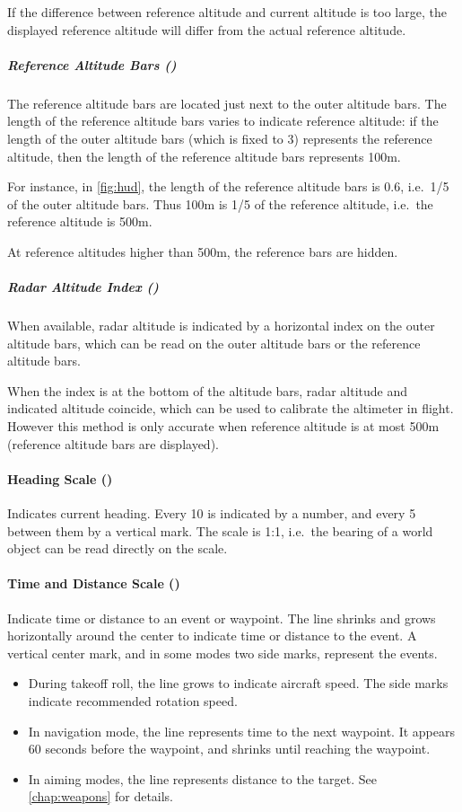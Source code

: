 If the difference between reference altitude and current altitude is too large,
the displayed reference altitude will differ from the actual reference altitude.

\subparagraph{Reference Altitude Bars ()}
The reference altitude bars are located just next to the outer altitude bars.
The length of the reference altitude bars varies to indicate reference altitude:
if the length of the outer altitude bars (which is fixed to 3\textdegree{})
represents the reference altitude, then the length of the reference altitude bars represents 100m.

For instance, in \cref{fig:hud}, the length of the reference altitude bars is
0.6\textdegree{}, i.e.\ 1/5 of the outer altitude bars.
Thus 100m is 1/5 of the reference altitude, i.e.\ the reference altitude is 500m.

At reference altitudes higher than 500m, the reference bars are hidden.

\subparagraph{Radar Altitude Index ()}
When available, radar altitude is indicated by a horizontal index on the outer altitude bars,
which can be read on the outer altitude bars or the reference altitude bars.

When the index is at the bottom of the altitude bars,
radar altitude and indicated altitude coincide,
which can be used to calibrate the altimeter in flight.
However this method is only accurate when reference altitude is at most 500m
(reference altitude bars are displayed).

\paragraph{Heading Scale ()}
Indicates current heading.
Every 10\textdegree{} is indicated by a number,
and every 5\textdegree{} between them by a vertical mark.
The scale is 1:1, i.e.\ the bearing of a world object can be read directly on the scale.

\paragraph{Time and Distance Scale ()}
Indicate time or distance to an event or waypoint.
The line shrinks and grows horizontally around the center to indicate time or distance to the event.
A vertical center mark, and in some modes two side marks, represent the events.
\begin{itemize}
  \item During takeoff roll, the line grows to indicate aircraft speed.
    The side marks indicate recommended rotation speed.
  \item In navigation mode, the line represents time to the next waypoint.
    It appears 60 seconds before the waypoint, and shrinks until reaching the waypoint.
  \item In aiming modes, the line represents distance to the target. See \cref{chap:weapons} for details.
\end{itemize}

